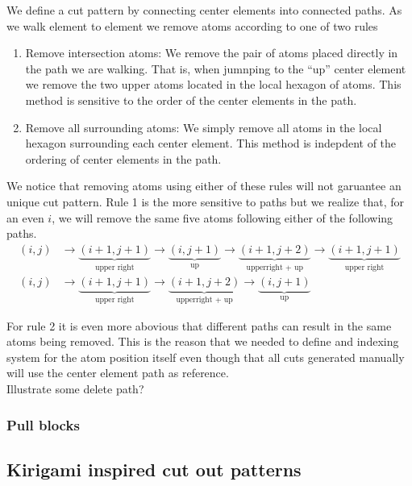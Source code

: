 We define a cut pattern by connecting center elements into connected paths. As we walk element to element we remove atoms according to one of two rules 
\begin{enumerate}
  \item Remove intersection atoms: We remove the pair of atoms placed directly in the path we are walking. That is, when jumnping to the ``up'' center element we remove the two upper atoms located in the local hexagon of atoms. This method is sensitive to the order of the center elements in the path. 
  \item Remove all surrounding atoms: We simply remove all atoms in the local hexagon surrounding each center element. This method is indepdent of the ordering of center elements in the path.
\end{enumerate}

We notice that removing atoms using either of these rules will not garuantee an unique cut pattern. Rule 1 is the more sensitive to paths but we realize that, for an even $i$, we will remove the same five atoms following either of the following paths.
\begin{align*}
  (i, j) &\rightarrow \underbrace{(i+1,j+1)}_{\text{upper right}} \rightarrow \underbrace{(i, j+1)}_{\text{up}} \rightarrow \underbrace{(i+1, j+2)}_{\text{upperright + up}} \rightarrow \underbrace{(i+1, j+1)}_{\text{upper right}} \\
  (i, j) &\rightarrow \underbrace{(i+1,j+1)}_{\text{upper right}} \rightarrow \underbrace{(i+1, j+2)}_{\text{upperright + up}} \rightarrow \underbrace{(i, j+1)}_{\text{up}}
\end{align*}

For rule 2 it is even more abovious that different paths can result in the same atoms being removed. This is the reason that we needed to define and indexing system for the atom position itself even though that all cuts generated manually will use the center element path as reference. \\

Illustrate some delete path?




\subsubsection{Pull blocks}
\subsection{Kirigami inspired cut out patterns}
